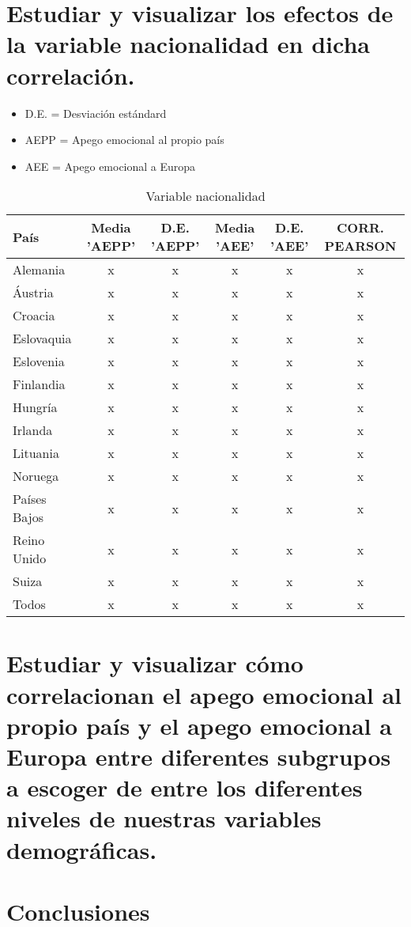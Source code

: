 \documentclass{article}
\begin{document}
\section{Estudiar y visualizar los efectos de la variable nacionalidad en dicha correlación.}
 \begin{itemize}
 \item D.E. = Desviación estándard
 \item AEPP = Apego emocional al propio país
 \item AEE = Apego emocional a Europa
 \end{itemize}
 \begin{table}[h!]
 \caption{Variable nacionalidad}
 \begin{tabular}{l | c c c c c}
 \hline
 \bf{País} & \bf{Media 'AEPP'} & \bf{D.E. 'AEPP'} & \bf{Media 'AEE'} & \bf{D.E. 'AEE'} & \bf{CORR. PEARSON} \\
 \hline
 Alemania & x & x & x & x & x \\
 Áustria & x & x & x & x & x \\
 Croacia & x & x & x & x & x \\
 Eslovaquia & x & x & x & x & x \\
 Eslovenia & x & x & x & x & x \\
 Finlandia & x & x & x & x & x \\
 Hungría & x & x & x & x & x \\
 Irlanda & x & x & x & x & x \\
 Lituania & x & x & x & x & x \\
 Noruega & x & x & x & x & x \\
 Países Bajos & x & x & x & x & x \\
 Reino Unido & x & x & x & x & x \\
 Suiza & x & x & x & x & x \\
 Todos & x & x & x & x & x \\
 \hline
 \end{tabular}
 \end{table}

\section{Estudiar y visualizar cómo correlacionan el apego emocional al propio país y el apego emocional a Europa entre diferentes subgrupos a escoger de entre los diferentes niveles de nuestras variables demográficas.}

\section*{Conclusiones}
\end{document}

